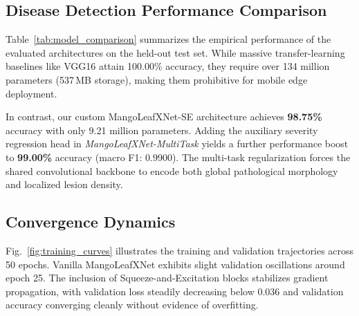 \documentclass[conference]{IEEEtran}
\begin{document}
\begin{table}[!htbp]
\caption{Diagnostic Model Performance Comparison on Test Set}
\label{tab:model_comparison}
\centering
{}
\end{table}

\subsection{Disease Detection Performance Comparison}
Table~\ref{tab:model_comparison} summarizes the empirical performance of the evaluated architectures on the held-out test set. While massive transfer-learning baselines like VGG16 attain 100.00\% accuracy, they require over 134 million parameters (537\,MB storage), making them prohibitive for mobile edge deployment.

In contrast, our custom MangoLeafXNet-SE architecture achieves \textbf{98.75\%} accuracy with only 9.21 million parameters. Adding the auxiliary severity regression head in \textit{MangoLeafXNet-MultiTask} yields a further performance boost to \textbf{99.00\%} accuracy (macro F1: 0.9900). The multi-task regularization forces the shared convolutional backbone to encode both global pathological morphology and localized lesion density.

\subsection{Convergence Dynamics}
Fig.~\ref{fig:training_curves} illustrates the training and validation trajectories across 50 epochs. Vanilla MangoLeafXNet exhibits slight validation oscillations around epoch 25. The inclusion of Squeeze-and-Excitation blocks stabilizes gradient propagation, with validation loss steadily decreasing below 0.036 and validation accuracy converging cleanly without evidence of overfitting.
\end{document}
